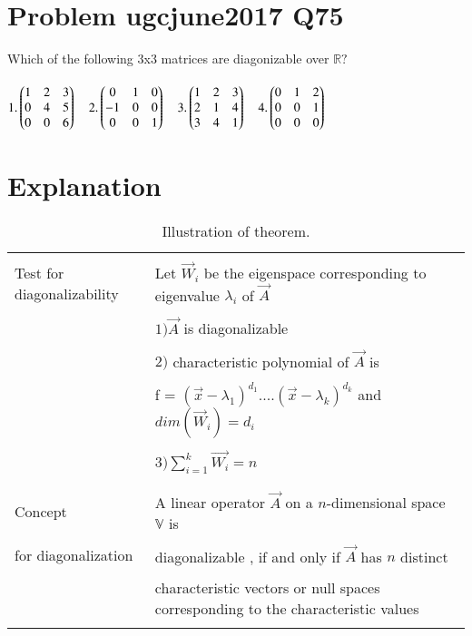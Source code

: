 \documentclass[journal,12pt]{IEEEtran}
\begin{document}
\renewcommand{\thefigure}{\theenumi}
\renewcommand{\thetable}{\theenumi}

\section{\textbf{Problem ugcjune2017 Q75}}
Which of the following 3x3 matrices are diagonizable over $\mathbb{R}?$\\
\\$1.\begin{pmatrix}1&2&3\\0&4&5\\0&0&6\end{pmatrix}\quad 2. \begin{pmatrix}0&1&0\\-1&0&0\\0&0&1\end{pmatrix}\quad 3.\begin{pmatrix}1&2&3\\2&1&4\\3&4&1\end{pmatrix}\quad 4.\begin{pmatrix}0&1&2\\0&0&1\\0&0&0\end{pmatrix}$\\

\section{\textbf{Explanation}}
\renewcommand{\thetable}{1}
\begin{longtable}{|l|l|}
\hline
\multirow{3}{*}{Test for diagonalizability} & \\
& Let $\vec{W}_{i}$ be the eigenspace corresponding to eigenvalue $\lambda_{i}$  of $\vec{A}$\\
&\\
& $1)\vec{A}$ is diagonalizable \\
&\\
& $2)$ characteristic polynomial of $\vec{A}$ is \\
&\\
& f = $(\vec{x}-\lambda_1)^{d_1}....(\vec{x}-\lambda_k)^{d_k}$ and $dim(\vec{W}_i) = d_i $\\
&\\
& $3) \sum_{i=1}^{k}\vec{W_i}=n$\\
&\\
\hline
\multirow{3}{*}{Concept} & \\
&
A linear operator $\vec{A}$ on a $n$-dimensional space $\mathbb{V}$ is\\ 
&\\ for diagonalization
& diagonalizable , if and only if $\vec{A}$ has $n$ distinct \\
&\\
& characteristic vectors or null spaces corresponding to the characteristic values\\
\hline
\caption{Illustration of theorem.}
\label{table:1}
\end{longtable}
\newpage
\end{document}

